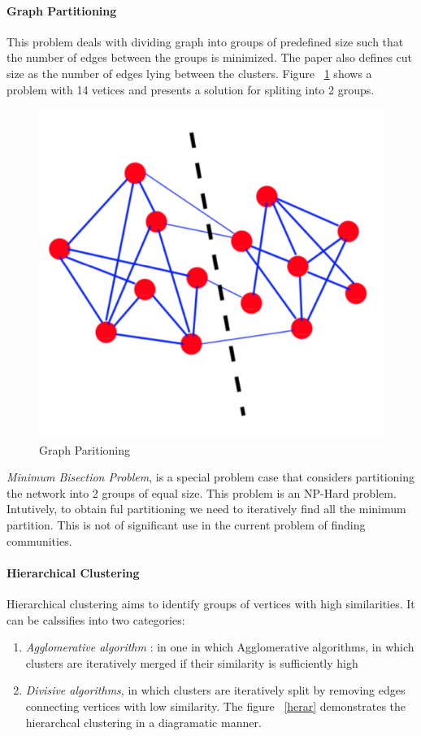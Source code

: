 \paragraph{Graph Partitioning}
This problem deals with dividing graph into groups of predefined size such that the number of edges between the groups is minimized. The paper \cite{communitypaper}  also defines cut size as the number of edges lying between the clusters.  Figure ~\ref{grapar} shows a problem with 14 vetices and presents a solution for spliting into 2 groups. 
\begin{figure}[H]
\centering
\includegraphics[scale=0.3]{graphpart.png}
\caption{\label{grapar}Graph Paritioning \cite{communitypaper}}

\end{figure}
\par \textit{Minimum Bisection Problem}, is a special problem case that considers partitioning the network into 2 groups of equal size. This problem is an NP-Hard problem. Intutively, to obtain ful partitioning we need to iteratively find all the minimum partition. This is not of significant use in the current problem of finding communities. 
\paragraph{Hierarchical Clustering}
Hierarchical clustering aims to identify groups of vertices with high similarities. It can be calssifies into two categories:
 \begin{enumerate}
\item \textit{Agglomerative algorithm} : in one in which Agglomerative algorithms, in which clusters are iteratively merged if their similarity is sufficiently
high
\item \textit{Divisive algorithms}, in which clusters are iteratively
split by removing edges connecting vertices with
low similarity.
The figure ~\ref{herar} demonstrates the hierarchcal clustering in a diagramatic manner.
\end{enumerate} 

